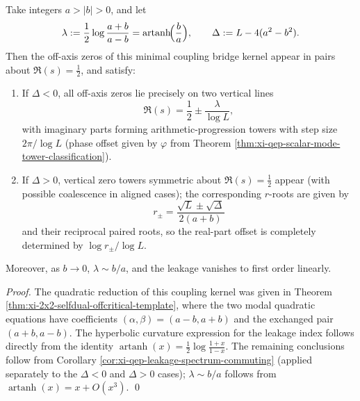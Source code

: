 \begin{corollary}\label{cor:xi-2x2-coupling-leakage-artanh}
Take integers \(a>|b|>0\), and let
\[
\lambda:=\frac12\log\frac{a+b}{a-b}=\operatorname{artanh}\!\Bigl(\frac{b}{a}\Bigr),
\qquad
\Delta:=L-4(a^2-b^2).
\]
Then the off-axis zeros of this minimal coupling bridge kernel appear in pairs about \(\Re(s)=\tfrac12\), and satisfy:
\begin{enumerate}
  \item If \(\Delta<0\), all off-axis zeros lie precisely on two vertical lines
  \[
  \Re(s)=\frac12\pm\frac{\lambda}{\log L},
  \]
  with imaginary parts forming arithmetic-progression towers with step size \(2\pi/\log L\) (phase offset given by \(\varphi\) from Theorem \ref{thm:xi-qep-scalar-mode-tower-classification}).
  \item If \(\Delta>0\), vertical zero towers symmetric about \(\Re(s)=\tfrac12\) appear (with possible coalescence in aligned cases); the corresponding \(r\)-roots are given by
  \[
  r_{\pm}=\frac{\sqrt L\pm\sqrt{\Delta}}{2(a+b)}
  \]
  and their reciprocal paired roots, so the real-part offset is completely determined by \(\log r_{\pm}/\log L\).
\end{enumerate}
Moreover, as \(b\to 0\), \(\lambda\sim b/a\), and the leakage vanishes to first order linearly.
\end{corollary}

\begin{proof}
The quadratic reduction of this coupling kernel was given in Theorem \ref{thm:xi-2x2-selfdual-offcritical-template}, where the two modal quadratic equations have coefficients \((\alpha,\beta)=(a-b,a+b)\) and the exchanged pair \((a+b,a-b)\).
The hyperbolic curvature expression for the leakage index follows directly from the identity
\(
\operatorname{artanh}(x)=\tfrac12\log\frac{1+x}{1-x}
\).
The remaining conclusions follow from Corollary \ref{cor:xi-qep-leakage-spectrum-commuting} (applied separately to the \(\Delta<0\) and \(\Delta>0\) cases); \(\lambda\sim b/a\) follows from \(\operatorname{artanh}(x)=x+O(x^3)\). \qed
\end{proof}

